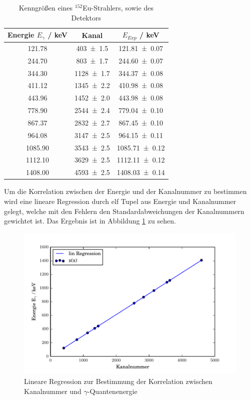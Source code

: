 \begin{table}[H]
  \centering
  \caption{Kenngrößen eines $^{152}$Eu-Strahlers, sowie des Detektors}
  \begin{tabular}{c | c c }
    \toprule
    Energie $E_{\gamma}$ / keV& Kanal & $E_{Exp}$ / keV \\
    \hline
    121.78  & \num{403 +- 1.5}	& \num{121.81 +- 0.07}	\\
    244.70  & \num{803 +- 1.7}  & \num{244.60 +- 0.07}	\\
    344.30  & \num{1128+- 1.7}	& \num{344.37 +- 0.08}	\\
    411.12  & \num{1345+- 2.2}	& \num{410.98 +- 0.08}	\\
    443.96  & \num{1452+- 2.0}	& \num{443.98 +- 0.08}	\\
    778.90  & \num{2544+- 2.4}	& \num{779.04 +- 0.10}	\\
    867.37  & \num{2832+- 2.7}	& \num{867.45 +- 0.10}	\\
    964.08  & \num{3147+- 2.5}	& \num{964.15 +- 0.11}	\\
    1085.90 & \num{3543+- 2.5}	& \num{1085.71 +- 0.12}	\\
    1112.10 & \num{3629+- 2.5}	& \num{1112.11 +- 0.12}	\\
    1408.00 & \num{4593+- 2.5}	& \num{1408.03 +- 0.14}	\\
    \bottomrule
  \end{tabular}
  \label{tab:CsSpekt}
\end{table}

Um die Korrelation zwischen der Energie und der Kanalnummer zu bestimmen wird eine lineare Regression durch elf Tupel aus Energie und Kanalnummer gelegt, welche mit den Fehlern den Standardabweichungen der Kanalnummern gewichtet ist. Das Ergebnis ist in Abbildung \ref{fig:RegEu} zu sehen.

\begin{figure}[H]
  \centering
  \includegraphics[width=\textwidth]{./build/CsReg.pdf}
  \caption{Lineare Regression zur Bestimmung der Korrelation zwischen Kanalnummer und $\gamma$-Quantenenergie}
  \label{fig:RegEu}
\end{figure}

